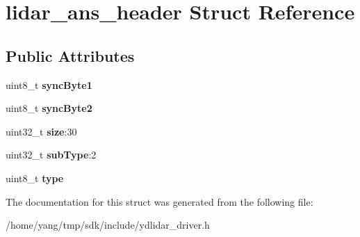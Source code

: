 \hypertarget{structlidar__ans__header}{}\section{lidar\+\_\+ans\+\_\+header Struct Reference}
\label{structlidar__ans__header}
\subsection*{Public Attributes}
\begin{DoxyCompactItemize}
\item 
uint8\+\_\+t {\bfseries sync\+Byte1}\hypertarget{structlidar__ans__header_aeaa5beb7182c922d6d68697ecf60318a}{}\label{structlidar__ans__header_aeaa5beb7182c922d6d68697ecf60318a}

\item 
uint8\+\_\+t {\bfseries sync\+Byte2}\hypertarget{structlidar__ans__header_a9ce80818478513e1cb36de5a17917958}{}\label{structlidar__ans__header_a9ce80818478513e1cb36de5a17917958}

\item 
uint32\+\_\+t {\bfseries size}\+:30\hypertarget{structlidar__ans__header_a6e01bc2ec02153e40f3402790b917af3}{}\label{structlidar__ans__header_a6e01bc2ec02153e40f3402790b917af3}

\item 
uint32\+\_\+t {\bfseries sub\+Type}\+:2\hypertarget{structlidar__ans__header_abd31cd42537cebe7958b95d3f4a07169}{}\label{structlidar__ans__header_abd31cd42537cebe7958b95d3f4a07169}

\item 
uint8\+\_\+t {\bfseries type}\hypertarget{structlidar__ans__header_aab38102a1a266b5bfb842b10bf2804b2}{}\label{structlidar__ans__header_aab38102a1a266b5bfb842b10bf2804b2}

\end{DoxyCompactItemize}


The documentation for this struct was generated from the following file\+:\begin{DoxyCompactItemize}
\item 
/home/yang/tmp/sdk/include/ydlidar\+\_\+driver.\+h\end{DoxyCompactItemize}
